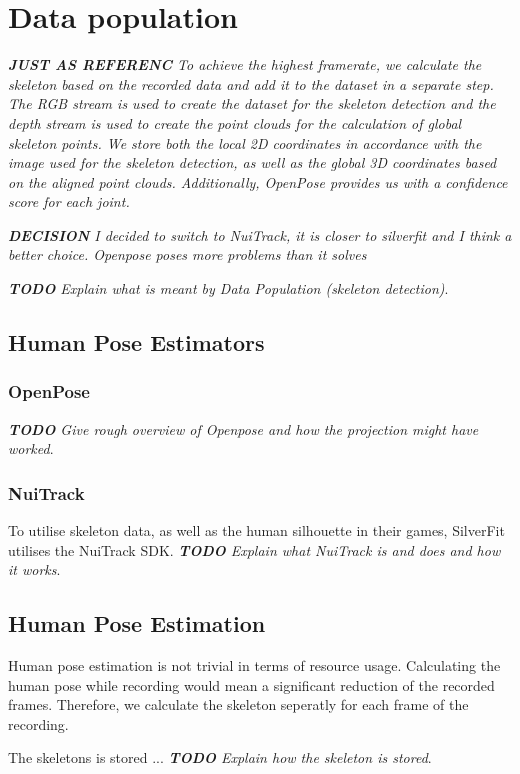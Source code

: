 \section{Data population}
\label{sec:data_population}

\textit{\textbf{JUST AS REFERENC} To achieve the highest framerate, we calculate the skeleton based on the recorded data and add it to the dataset in a separate step. The RGB stream is used to create the dataset for the skeleton detection and the depth stream is used to create the point clouds for the calculation of global skeleton points. We store both the local 2D coordinates in accordance with the image used for the skeleton detection, as well as the global 3D coordinates based on the aligned point clouds. Additionally, OpenPose provides us with a confidence score for each joint.}

\textit{\textbf{DECISION} I decided to switch to NuiTrack, it is closer to silverfit and I think a better choice. Openpose poses more problems than it solves}

\textit{\textbf{TODO} Explain what is meant by Data Population (skeleton detection)}.

\subsection{Human Pose Estimators}

\subsubsection{OpenPose}

\textit{\textbf{TODO} Give rough overview of Openpose and how the projection might have worked}.

\subsubsection{NuiTrack}

To utilise skeleton data, as well as the human silhouette in their games, SilverFit utilises the NuiTrack SDK.  \textit{\textbf{TODO} Explain what NuiTrack is and does and how it works}.

\subsection{Human Pose Estimation}

Human pose estimation is not trivial in terms of resource usage. Calculating the human pose while recording would mean a significant reduction of the recorded frames. Therefore, we calculate the skeleton seperatly for each frame of the recording.

The skeletons is stored ... \textit{\textbf{TODO} Explain how the skeleton is stored}.